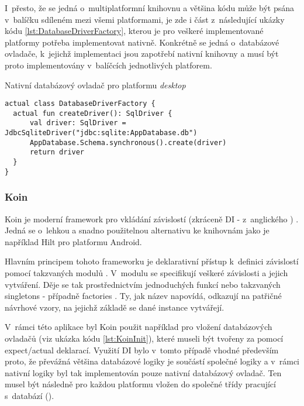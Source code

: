 I~přesto, že se jedná o~multiplatformní knihovnu a většina kódu může být psána v~balíčku sdíleném mezi všemi platformami, je zde i 
část z~následující ukázky kódu \ref{lst:DatabaseDriverFactory}, kterou je pro veškeré implementované platformy potřeba implementovat
nativně. Konkrétně se jedná o~databázové ovladače, k~jejichž implementaci jsou 
zapotřebí nativní knihovny a musí být proto implementovány v~balíčcích jednotlivých platforem.

\begin{listing}[H]
\caption{Nativní databázový ovladač pro platformu \textit{desktop}}\label{lst:DatabaseDriverFactory}
\begin{verbatim}
actual class DatabaseDriverFactory {
  actual fun createDriver(): SqlDriver {
      val driver: SqlDriver = JdbcSqliteDriver("jdbc:sqlite:AppDatabase.db")
      AppDatabase.Schema.synchronous().create(driver)
      return driver
  }
}
\end{verbatim}
\end{listing}

\subsubsection*{Koin}
Koin je moderní framework pro vkládání závislostí (zkráceně DI - z~anglického ) \cite{Koin}. Jedná se o~lehkou a snadno 
použitelnou alternativu ke knihovnám jako je například Hilt pro platformu Android.

Hlavním principem tohoto frameworku je deklarativní přístup k~definici závislostí pomocí takzvaných modulů \cite{Koin}. V~modulu se specifikují veškeré závislosti a 
jejich vytváření. Děje se tak prostřednictvím jednoduchých funkcí nebo takzvaných singletons - případně factories \cite{KoinDef}. Ty, jak název napovídá, odkazují na 
patřičné návrhové vzory, na jejichž základě se dané instance vytvářejí.


V~rámci této aplikace byl Koin použit například pro vložení databázových ovladačů (viz ukázka kódu \ref{lst:KoinInit}), které museli být tvořeny za pomocí expect/actual deklarací.
Využití DI bylo v~tomto případě vhodné především proto, že převážná většina databázové logiky je součástí společné 
logiky a v~rámci nativní logiky byl tak implementován pouze nativní databázový ovladač. Ten musel být následně pro každou platformu vložen do 
společné třídy pracující s~databází ().

